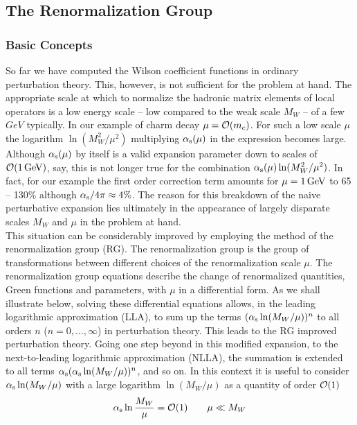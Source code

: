 \subsection{The Renormalization Group}
            \label{sec:basicform:rg}
\subsubsection{Basic Concepts}
               \label{sec:basicform:rg:basic}
So far we have computed the Wilson coefficient functions  in ordinary
perturbation theory. This, however, is not sufficient for the problem
at hand. The appropriate scale at which to normalize the hadronic
matrix elements of local operators is a low energy scale -- low
compared to the weak scale $M_W$ -- of a few $GeV$ typically.
In our example of charm decay $\mu={\cal O}(m_c)$. For such a low scale
$\mu$ the logarithm $\ln(M^2_W/\mu^2)$ multiplying $\alpha_{\rm s}(\mu)$
in the expression  becomes large. Although $\alpha_{\rm s}(\mu)$
by itself is a valid expansion parameter down to scales of
${\cal O}(1\, {\rm GeV})$, say, this is not longer true for the combination
$\alpha_{\rm s}(\mu) \ln(M^2_W/\mu^2)$. In fact, for our example 
the first order correction term amounts for $\mu=1\, {\rm GeV}$ to
65 -- 130\% although $\alpha_{\rm s}/4\pi\approx 4\%$. The reason for
this breakdown of the naive perturbative expansion lies
ultimately in the appearance of largely disparate scales $M_W$ and
$\mu$ in the problem at hand. \\
This situation can be considerably improved by employing the
method of the renormalization group (RG). The renormalization group
is the group of transformations between different choices of the
renormalization scale $\mu$. The renormalization group equations
describe the change of renormalized quantities, Green functions
and parameters, with $\mu$ in a differential form. As we shall
illustrate below, solving these differential equations allows,
in the leading logarithmic approximation (LLA),
to sum up the terms $(\alpha_{\rm s}\ln(M_W/\mu))^n$ to all orders $n$ ($n=0,
\ldots, \infty$) in perturbation theory. This leads to the RG improved
perturbation theory. Going one step beyond in this modified expansion,
to the next-to-leading logarithmic approximation (NLLA), the summation
is extended to all terms $\alpha_{\rm s}(\alpha_{\rm s}\ln(M_W/\mu))^n$, and so on.
In this context it is useful to consider $\alpha_{\rm s}\ln(M_W/\mu)$ with
a large logarithm $\ln(M_W/\mu)$ as a quantity of order ${\cal O}(1)$
\begin{equation}\label{alog}
\alpha_{\rm s} \ln{M_W\over\mu}={\cal O}(1)\qquad  \mu\ll M_W   \end{equation}
